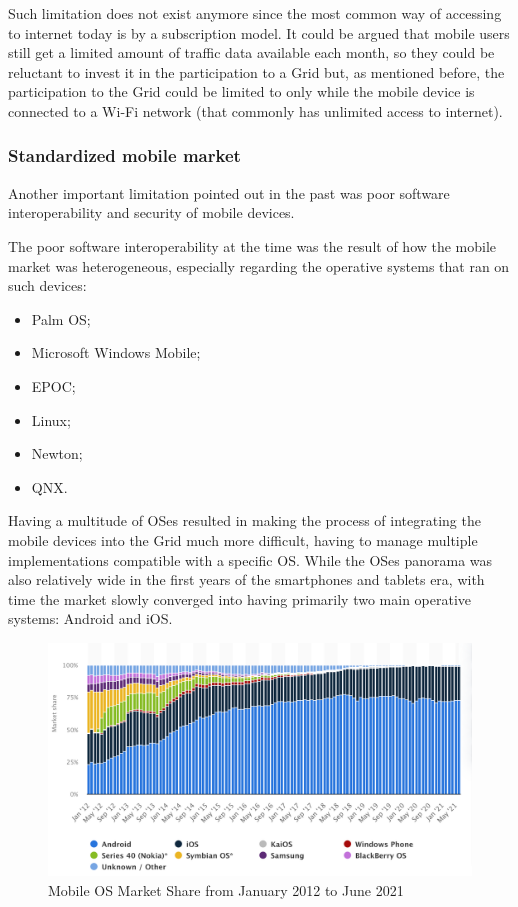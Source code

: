 Such limitation does not exist anymore since the most common way of accessing to internet today is by a subscription model. It could be argued that mobile users still get a limited amount of traffic data available each month, so they could be reluctant to invest it in the participation to a Grid but, as mentioned before, the participation to the Grid could be limited to only while the mobile device is connected to a Wi-Fi network (that commonly has unlimited access to internet).

\subsubsection{Standardized mobile market}
Another important limitation pointed out in the past was poor software interoperability and security of 
mobile devices.

The poor software interoperability at the time was the result of how the mobile market was heterogeneous, especially regarding the operative systems that ran on such devices:
\begin{itemize}
    \item Palm OS;
    \item Microsoft Windows Mobile;
    \item EPOC;
    \item Linux;
    \item Newton;
    \item QNX.
\end{itemize}
Having a multitude of OSes resulted in making the process of integrating the mobile devices into the Grid much more difficult, having to manage multiple implementations compatible with a specific OS. While the OSes panorama was also relatively wide in the first years of the smartphones and tablets era, with time the market slowly converged into having primarily two main operative systems: Android and iOS.

\begin{figure}[!ht]
    \centering
    \includegraphics[scale=0.31]{document/chapters/chapter_1/images/os_market_share_2012_to_2021.png}
    \caption{Mobile OS Market Share from January 2012 to June 2021 \cite{mobile_and_desktop_os_market}}
    \label{fig:os_market_share_2012_to_2021}
\end{figure}

